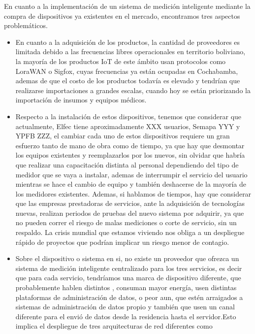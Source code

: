 En cuanto a la implementación de un sistema de medición inteligente mediante la compra de dispositivos
ya existentes en el mercado, encontramos tres aspectos problemáticos.
\begin{itemize}
    \item En cuanto a la adquisición de los productos, la cantidad de proveedores es limitada debido a las
    frecuencias libres operacionales en territorio boliviano, la mayoría de los productos IoT de este ámbito
    usan protocolos como LoraWAN o Sigfox, cuyas frecuencias ya están ocupadas en Cochabamba, ademas de que
    el costo de los productos todavía es elevado y tendrían que realizarse importaciones a grandes escalas, 
    cuando hoy se están priorizando la importación de insumos y equipos médicos.
    \item Respecto a la instalación de estos dispositivos, tenemos que considerar que actualmente, Elfec tiene
    aproximadamente XXX usuarios, Semapa YYY y YPFB ZZZ, el cambiar cada uno de estos dispositivos requiere un
    gran esfuerzo tanto de mano de obra como de tiempo, ya que hay que desmontar los equipos existentes y 
    reemplazarlos por los nuevos, sin olvidar que habría que realizar una capacitación distinta al personal
    dependiendo del tipo de medidor que se vaya a instalar, ademas de interrumpir el servicio del usuario mientras
    se hace el cambio de equipo y también deshacerse de la mayoría de los medidores existentes. Ademas, si hablamos
    de tiempos, hay que considerar que las empresas prestadoras de servicios, ante la adquisición de tecnologías
    nuevas, realizan periodos de pruebas del nuevo sistema por adquirir, ya que no pueden correr el riesgo de malas
    mediciones o corte de servicio, sin un respaldo. La crisis mundial que estamos viviendo nos obliga a un despliegue
    rápido de proyectos que podrían implicar un riesgo menor de contagio.
    \item Sobre el dispositivo o sistema en si, no existe un proveedor que ofrezca un sistema de medición inteligente
    centralizado para los tres servicios, es decir que para cada servicio, tendríamos una marca de dispositivo diferente,
    que probablemente hablen distintos , consuman mayor energía, usen distintas plataformas de administración de datos, o peor aun, que
    estén arraigados a sistemas de administración de datos propio y también que usen un canal diferente para el envió de
    datos desde la residencia hasta el servidor.Esto implica el despliegue de tres arquitecturas de red diferentes como 

\end{itemize}
